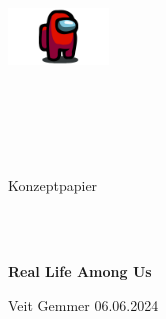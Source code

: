 \author{Veit Gemmer}
\date{\today}
\begin{center}
\includegraphics[height=1.5cm]{graphics/among_us.png}
\end{center}
\begin{verbatim}





\end{verbatim}
\begin{center}
    \Large{Konzeptpapier}
\end{center}
\begin{verbatim}



\end{verbatim}
\begin{center}
    \textbf{\Large{Real Life Among Us}}
\end{center}
\vfill
\begin{center}
    Veit Gemmer
    06.06.2024
    \begin{verbatim}



    \end{verbatim}
\end{center}
